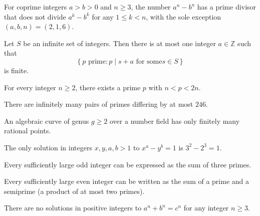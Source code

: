 \documentclass[11pt]{scrartcl}
\providecommand{\ZZ}{\mathbb Z}
\begin{document}
\begin{theorem}
  For coprime integers $a > b > 0$ and $n \ge 3$,
  the number $a^n - b^n$ has a prime divisor
  that does not divide $a^k - b^k$ for any $1 \le k < n$,
  with the sole exception $(a, b, n) = (2, 1, 6)$.
\end{theorem}

\begin{theorem}
  Let $S$ be an infinite set of integers.
  Then there is at most one integer $a \in \ZZ$ such that
  \[ \left\{ p \text{ prime} : p \mid s + a \text{ for some} s \in S\right\} \]
  is finite.
\end{theorem}

\begin{theorem}
  For every integer $n \ge 2$, there exists a prime $p$ with $n < p < 2n$.
\end{theorem}

\begin{theorem}
  There are infinitely many pairs of primes differing by at most $246$.
\end{theorem}

\begin{theorem}
  An algebraic curve of genus $g \ge 2$ over a number field
  has only finitely many rational points.
\end{theorem}

\begin{theorem}
  The only solution in integers $x, y, a, b > 1$
  to $x^a - y^b = 1$ is $3^2 - 2^3 = 1$.
\end{theorem}

\begin{theorem}
  Every sufficiently large odd integer
  can be expressed as the sum of three primes.
\end{theorem}

\begin{theorem}
  Every sufficiently large even integer
  can be written as the sum of a prime
  and a semiprime (a product of at most two primes).
\end{theorem}

\begin{theorem}
  There are no solutions in positive integers
  to $a^n + b^n = c^n$ for any integer $n \ge 3$.
\end{theorem}
\end{document}
